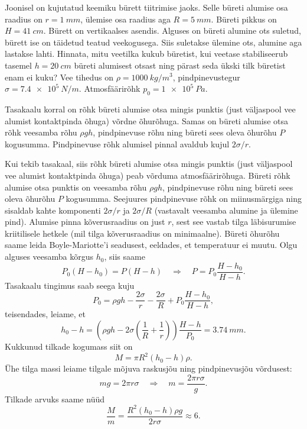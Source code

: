 Joonisel on kujutatud keemiku bürett tiitrimise jaoks. Selle büreti alumise osa raadius on $r = \SI{1}{mm}$, ülemise osa raadius aga $R = \SI{5}{mm}$. Büreti pikkus on $H = \SI{41}{cm}$. Bürett on vertikaalses asendis. Alguses on büreti alumine ots suletud, bürett ise on täidetud teatud veekogusega. Siis suletakse ülemine ots, alumine aga lastakse lahti. Hinnata, mitu veetilka kukub büretist, kui veetase stabiliseerub tasemel $h = \SI{20}{cm}$ büreti alumisest otsast ning pärast seda ükski tilk büretist enam ei kuku? Vee tihedus on $\rho = \SI{1000}{kg/m^3}$, pindpinevustegur $\sigma = \SI{7,4e5}{N/m}$. Atmosfäärirõhk $p_0 = \SI{1e5}{Pa}$.

\hint
Tasakaalu korral on rõhk büreti alumise otsa mingis punktis (just väljaspool vee alumist kontaktpinda õhuga) võrdne õhurõhuga. Samas on büreti alumise otsa rõhk veesamba rõhu $\rho g h$, pindpinevuse rõhu ning büreti sees oleva õhurõhu $P$ kogusumma. Pindpinevuse rõhk alumisel pinnal avaldub kujul $2 \sigma / r$.

\solu
Kui tekib tasakaal, siis rõhk büreti alumise otsa mingis punktis (just väljaspool vee alumist kontaktpinda õhuga) peab võrduma atmosfäärirõhuga. Büreti rõhk alumise otsa punktis on veesamba rõhu $\rho g h$, pindpinevuse rõhu ning büreti sees oleva õhurõhu $P$ kogusumma. Seejuures pindpinevuse rõhk on miinusmärgiga ning sisaldab kahte komponenti $2 \sigma / r$ ja $2 \sigma / R$ (vastavalt veesamba alumine ja ülemine pind). Alumise pinna kõverusraadius on just $r$, sest see vastab tilga läbisurumise kriitilisele hetkele (mil tilga kõverusraadius on minimaalne). Büreti õhurõhu saame leida Boyle-Mariotte'i seadusest, eeldades, et temperatuur ei muutu. Olgu alguses veesamba kõrgus $h_{0}$, siis saame
$$
P_{0}\left(H-h_{0}\right)=P(H-h) \quad \Rightarrow \quad P=P_{0} \frac{H-h_{0}}{H-h}.
$$
Tasakaalu tingimus saab seega kuju
$$
P_{0}=\rho g h-\frac{2 \sigma}{r}-\frac{2 \sigma}{R}+P_{0} \frac{H-h_{0}}{H-h},
$$
teisendades, leiame, et
$$
h_{0}-h=\left(\rho g h-2 \sigma\left(\frac{1}{R}+\frac{1}{r}\right)\right) \frac{H-h}{P_{0}}=\SI{3,74}{mm}.
$$
Kukkunud tilkade kogumass siit on
$$
M=\pi R^{2}\left(h_{0}-h\right) \rho .
$$
Ühe tilga massi leiame tilgale mõjuva raskusjõu ning pindpinevusjõu võrdusest:
$$
m g=2 \pi r \sigma \quad \Rightarrow \quad m=\frac{2 \pi r \sigma}{g}.
$$
Tilkade arvuks saame nüüd
$$
\frac{M}{m}=\frac{R^{2}\left(h_{0}-h\right) \rho g}{2 r \sigma} \approx 6.
$$

\probend
